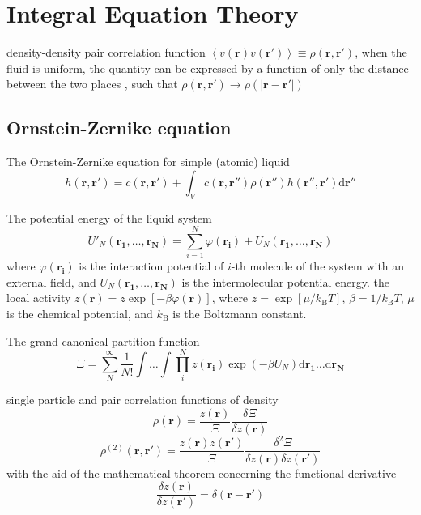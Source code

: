 
\chapter{Integral Equation Theory\label{chpt:iem}}

density-density pair correlation function $\left\langle v(\mathbf{r})v(\mathbf{r'})\right\rangle \equiv\rho(\mathbf{r},\mathbf{r'})$,
when the fluid is uniform, the quantity can be expressed by a function
of only the distance between the two places , such that $\rho(\mathbf{r},\mathbf{r'})\rightarrow\rho(\left|\mathbf{r}-\mathbf{r'}\right|)$\citep{hirata_molecular_2004}


\section{Ornstein-Zernike equation}

The Ornstein-Zernike equation for simple (atomic) liquid
\begin{equation}
h(\mathbf{r},\mathbf{r'})=c(\mathbf{r},\mathbf{r'})+\int_{V}c(\mathbf{r},\mathbf{r''})\rho(\mathbf{r''})h(\mathbf{r''},\mathbf{r'})\mathrm{d}\mathbf{r''}
\end{equation}


The potential energy of the liquid system
\begin{equation}
U'_{N}(\mathbf{r_{1}},\ldots,\mathbf{r_{N}})=\sum_{i=1}^{N}\varphi(\mathbf{r_{i}})+U_{N}(\mathbf{r_{1}},\ldots,\mathbf{r_{N}})
\end{equation}
where $\varphi(\mathbf{r_{i}})$ is the interaction potential of $i$-th
molecule of the system with an external field, and $U_{N}(\mathbf{r_{1}},\ldots,\mathbf{r_{N}})$
is the intermolecular potential energy. the local activity $z(\mathbf{r})=z\exp\left[-\beta\varphi(\mathbf{r})\right]$,
where $z=\exp\left[\mu/k_{\mathrm{B}}T\right]$, $\beta=1/k_{\mathrm{B}}T$,
$\mu$ is the chemical potential, and $k_{\mathrm{B}}$ is the Boltzmann
constant.

The grand canonical partition function
\begin{equation}
\Xi=\sum_{N}^{\infty}\frac{1}{N!}\int\ldots\int\prod_{i}^{N}z(\mathbf{r_{i}})\exp\left(-\beta U_{N}\right)\mathrm{d}\mathbf{r_{1}}\ldots\mathrm{d}\mathbf{r_{N}}
\end{equation}


single particle and pair correlation functions of density
\begin{equation}
\rho(\mathbf{r})=\frac{z(\mathbf{r})}{\Xi}\frac{\delta\Xi}{\delta z(\mathbf{r})}
\end{equation}
\begin{equation}
\rho^{(2)}(\mathbf{r},\mathbf{r}')=\frac{z(\mathbf{r})z(\mathbf{r}')}{\Xi}\frac{\delta^{2}\Xi}{\delta z(\mathbf{r})\delta z(\mathbf{r}')}
\end{equation}
with the aid of the mathematical theorem concerning the functional
derivative 
\begin{equation}
\frac{\delta z(\mathbf{r})}{\delta z(\mathbf{r}')}=\delta(\mathbf{r}-\mathbf{r}')
\end{equation}


